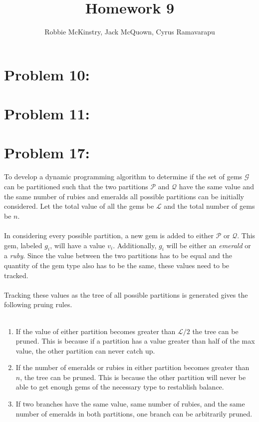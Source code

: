 \documentclass[12pt]{article}
\begin{document}
\title{Homework 9}
\author{Robbie McKinstry, Jack McQuown, Cyrus Ramavarapu}
\renewcommand{\today}{22 September 2016}
\renewcommand{\baselinestretch}{1.5}
\maketitle

\section*{Problem 10: }
\section*{Problem 11: }
\section*{Problem 17: }
To develop a dynamic programming algorithm to determine if the
set of gems $\mathcal{G}$ can be partitioned such that the two
partitions $\mathcal{P}$ and $\mathcal{Q}$ have the same value
and the same number of rubies and emeralds all possible partitions
can be initially considered.  Let the total value of all the gems
be $\mathcal{L}$ and the total number of gems be $n$.\\\\
In considering every possible partition, a new gem is added to 
either $\mathcal{P}$ or $\mathcal{Q}$.  This gem, labeled
$g_i$, will have a value $v_i$. Additionally, $g_i$ will be 
either an \textit{emerald} or a \textit{ruby}.  Since the value 
between the two partitions has to be equal and the quantity of the
gem type also has to be the same, these values need to be tracked.\\\\
Tracking these values as the tree of all possible partitions is
generated gives the following pruing rules.\\\\
\begin{enumerate}
    \item If the value of either partition becomes greater than $\mathcal{L}/2$
          the tree can be pruned.  This is because if a partition has a value
          greater than half of the max value, the other partition can never
          catch up.
    \item If the number of emeralds or rubies in either partition becomes
          greater than $n$, the tree can be pruned. This is because the other
          partition will never be able to get enough gems of the necessary
          type to restablish balance.
    \item If two branches have the same value, same number of rubies, and
          the same number of emeralds in both partitions, one branch can be
          arbitrarily pruned.
\end{enumerate}
\end{document}
